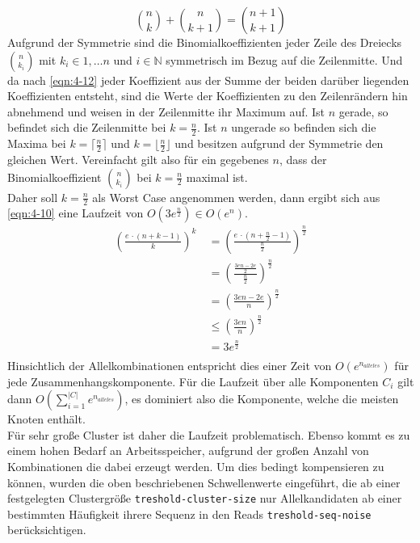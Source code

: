 \begin{equation} \label{eqn:4-12}
\tag{4-12}
\binom{n}{k} + \binom{n}{k + 1} = \binom{n + 1}{k + 1} 
\end{equation} 
Aufgrund der Symmetrie sind die Binomialkoeffizienten jeder Zeile des Dreiecks $\binom{n}{k_{i}}$ mit $ k_{i} \in 1, \dots n $ und $ i \in \mathds{N} $ symmetrisch im Bezug auf die Zeilenmitte. Und da nach \eqref{eqn:4-12} jeder Koeffizient aus der Summe der beiden darüber liegenden Koeffizienten entsteht, sind die Werte der Koeffizienten zu den Zeilenrändern hin abnehmend und weisen in der Zeilenmitte ihr Maximum auf. Ist $n$ gerade, so befindet sich die Zeilenmitte bei $ k = \frac{n}{2} $. Ist $n$ ungerade so befinden sich die Maxima bei $ k = \lceil \frac{n}{2} \rceil $ und $ k = \lfloor \frac{n}{2} \rfloor $ und besitzen aufgrund der Symmetrie den gleichen Wert. Vereinfacht gilt also für ein gegebenes $n$, dass der Binomialkoeffizient $\binom{n}{k_{i}}$ bei $ k = \frac{n}{2} $ maximal ist. \\

Daher soll $ k = \frac{n}{2} $ als Worst Case angenommen werden, dann ergibt sich aus \eqref{eqn:4-10} eine Laufzeit von $ O(3e^{\frac{n}{2}} ) \in O(e^n) $. 
\begin{equation} \label{eqn:4-13}
\tag{4-13}
\begin{aligned}
\left( \frac{e \, \cdotp (n + k - 1)}{k}\right)^k &\ {} = \left( \frac{e \, \cdotp (n + \frac{n}{2} - 1)}{\frac{n}{2}}\right)^{\frac{n}{2}}  \\
&\ = \left( \frac{\frac{3en - 2e}{2}} {\frac{n}{2}}\right)^{\frac{n}{2}} \\
&\ = \left( \frac{3en - 2e}{n}\right)^{\frac{n}{2}} \\
&\ \leq \left( \frac{3en}{n}\right)^{\frac{n}{2}}\\
&\ = 3e^{\frac{n}{2}}\\
\end{aligned}
\end{equation}
Hinsichtlich der Allelkombinationen entspricht dies einer Zeit von $ O(e^{n_{alleles}}) $ für jede Zusammenhangskomponente. Für die Laufzeit über alle Komponenten $C_{i}$ gilt dann \linebreak $O\left( \sum\limits_{i=1}^{|C|}e^{n_{alleles}}\right) $, es dominiert also die Komponente, welche die meisten Knoten enthält. \\

Für sehr große Cluster ist daher die Laufzeit problematisch. Ebenso kommt es zu einem hohen Bedarf an Arbeitsspeicher, aufgrund der großen Anzahl von Kombinationen die dabei erzeugt werden. Um dies bedingt kompensieren zu können, wurden die oben beschriebenen Schwellenwerte eingeführt, die ab einer festgelegten Clustergröße \lstinline|treshold-cluster-size| nur Allelkandidaten ab einer bestimmten Häufigkeit ihrere Sequenz in den Reads \linebreak \lstinline|treshold-seq-noise| berücksichtigen.\\

